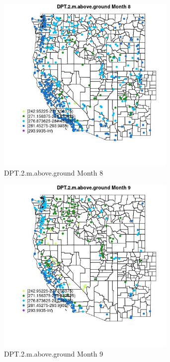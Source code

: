 \begin{figure} 
\centering  
\includegraphics[width=0.77\textwidth]{Code_Outputs/Report_ML_input_PM25_Step4_part_e_de_duplicated_aves_compiled_2019-05-18wNAs_MapObsMo8DPT2maboveground.jpg} 
\caption{\label{fig:Report_ML_input_PM25_Step4_part_e_de_duplicated_aves_compiled_2019-05-18wNAsMapObsMo8DPT2maboveground}DPT.2.m.above.ground Month 8} 
\end{figure} 
 

\begin{figure} 
\centering  
\includegraphics[width=0.77\textwidth]{Code_Outputs/Report_ML_input_PM25_Step4_part_e_de_duplicated_aves_compiled_2019-05-18wNAs_MapObsMo9DPT2maboveground.jpg} 
\caption{\label{fig:Report_ML_input_PM25_Step4_part_e_de_duplicated_aves_compiled_2019-05-18wNAsMapObsMo9DPT2maboveground}DPT.2.m.above.ground Month 9} 
\end{figure} 
 


